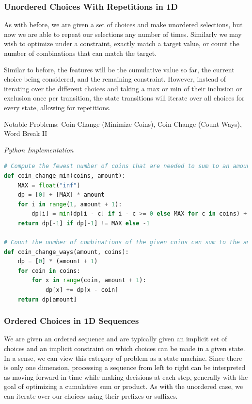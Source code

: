 \documentclass{article}
\newcommand{\comment}[1]{}
\begin{document}
\subsubsection*{Unordered Choices With Repetitions in 1D}
As with before, we are given a set of choices and make unordered selections, but now we are able to repeat our selections any number of times. Similarly we may wish to optimize under a constraint, exactly match a target value, or count the number of combinations that can match the target.

Similar to before, the features will be the cumulative value so far, the current choice being considered, and the remaining constraint. However, instead of iterating over the different choices and taking a max or min of their inclusion or exclusion once per transition, the state transitions will iterate over all choices for every state, allowing for repetitions.

Notable Problems: Coin Change (Minimize Coins), Coin Change (Count Ways), Word Break II

\vspace{8pt} \emph{Python Implementation}
\begin{lstlisting}[language=Python]
# Compute the fewest number of coins that are needed to sum to an amount
def coin_change_min(coins, amount):
    MAX = float("inf")
    dp = [0] + [MAX] * amount
    for i in range(1, amount + 1):
        dp[i] = min(dp[i - c] if i - c >= 0 else MAX for c in coins) + 1 
    return dp[-1] if dp[-1] != MAX else -1
    
# Count the number of combinations of the given coins can sum to the amount
def coin_change_ways(amount, coins):
    dp = [0] * (amount + 1)
    for coin in coins:
        for x in range(coin, amount + 1):
            dp[x] += dp[x - coin]
    return dp[amount]
\end{lstlisting}

\subsubsection*{Ordered Choices in 1D Sequences}

\comment{
- sliding window with state (?)

for state1 in all values of state1:
    for state2 in in all values of state2:
        for ...
            dp[state1][state2][...] = best_choice(choice1, choice2, ...)
}

We are given an ordered sequence and are typically given an implicit set of choices and an implicit constraint on which choices can be made in a given state. In a sense, we can view this category of problem as a state machine. Since there is only one dimension, processing a sequence from left to right can be interpreted as moving forward in time while making decisions at each step, generally with the goal of optimizing a cumulative sum or product. As with the unordered case, we can iterate over our choices using their prefixes or suffixes.
\end{document}
